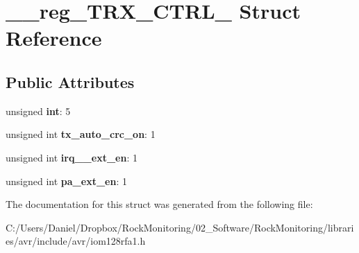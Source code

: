 \hypertarget{struct____reg___t_r_x___c_t_r_l__1}{}\section{\+\_\+\+\_\+reg\+\_\+\+T\+R\+X\+\_\+\+C\+T\+R\+L\+\_ Struct Reference}
\label{struct____reg___t_r_x___c_t_r_l__1}
\subsection*{Public Attributes}
\begin{DoxyCompactItemize}
\item 
unsigned {\bfseries int}\+: 5\hypertarget{struct____reg___t_r_x___c_t_r_l__1_a66ed5d554dde6fd38cc6618f26c0037c}{}\label{struct____reg___t_r_x___c_t_r_l__1_a66ed5d554dde6fd38cc6618f26c0037c}

\item 
unsigned int {\bfseries tx\+\_\+auto\+\_\+crc\+\_\+on}\+: 1\hypertarget{struct____reg___t_r_x___c_t_r_l__1_ad3414241b0fc37acced3c724dbc6dec3}{}\label{struct____reg___t_r_x___c_t_r_l__1_ad3414241b0fc37acced3c724dbc6dec3}

\item 
unsigned int {\bfseries irq\+\_\+\_\+ext\+\_\+en}\+: 1\hypertarget{struct____reg___t_r_x___c_t_r_l__1_a886d77c124ded50b680f90b52c8101cf}{}\label{struct____reg___t_r_x___c_t_r_l__1_a886d77c124ded50b680f90b52c8101cf}

\item 
unsigned int {\bfseries pa\+\_\+ext\+\_\+en}\+: 1\hypertarget{struct____reg___t_r_x___c_t_r_l__1_ab30a8156e8ffdeecb8044ab56d9f79cf}{}\label{struct____reg___t_r_x___c_t_r_l__1_ab30a8156e8ffdeecb8044ab56d9f79cf}

\end{DoxyCompactItemize}


The documentation for this struct was generated from the following file\+:\begin{DoxyCompactItemize}
\item 
C\+:/\+Users/\+Daniel/\+Dropbox/\+Rock\+Monitoring/02\+\_\+\+Software/\+Rock\+Monitoring/libraries/avr/include/avr/iom128rfa1.\+h\end{DoxyCompactItemize}
